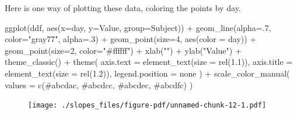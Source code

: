 \documentclass[
  letterpaper,
  DIV=11,
  numbers=noendperiod]{scrreprt}
\newenvironment{Shaded}{\begin{snugshade}}{\end{snugshade}}
\newcommand{\AttributeTok}[1]{\textcolor[rgb]{0.40,0.45,0.13}{#1}}
\newcommand{\DecValTok}[1]{\textcolor[rgb]{0.68,0.00,0.00}{#1}}
\newcommand{\FloatTok}[1]{\textcolor[rgb]{0.68,0.00,0.00}{#1}}
\newcommand{\FunctionTok}[1]{\textcolor[rgb]{0.28,0.35,0.67}{#1}}
\newcommand{\NormalTok}[1]{\textcolor[rgb]{0.00,0.23,0.31}{#1}}
\newcommand{\SpecialCharTok}[1]{\textcolor[rgb]{0.37,0.37,0.37}{#1}}
\newcommand{\StringTok}[1]{\textcolor[rgb]{0.13,0.47,0.30}{#1}}
\begin{document}
Here is one way of plotting these data, coloring the points by day.

\begin{Shaded}
\begin{Highlighting}[]
\FunctionTok{ggplot}\NormalTok{(ddf, }\FunctionTok{aes}\NormalTok{(}\AttributeTok{x=}\NormalTok{day, }\AttributeTok{y=}\NormalTok{Value, }\AttributeTok{group=}\NormalTok{Subject)) }\SpecialCharTok{+}
  \FunctionTok{geom\_line}\NormalTok{(}\AttributeTok{alpha=}\NormalTok{.}\DecValTok{7}\NormalTok{, }\AttributeTok{color=}\StringTok{"gray77"}\NormalTok{, }\AttributeTok{alpha=}\NormalTok{.}\DecValTok{3}\NormalTok{) }\SpecialCharTok{+}
  \FunctionTok{geom\_point}\NormalTok{(}\AttributeTok{size=}\DecValTok{4}\NormalTok{, }\FunctionTok{aes}\NormalTok{(}\AttributeTok{color =}\NormalTok{ day)) }\SpecialCharTok{+}
  \FunctionTok{geom\_point}\NormalTok{(}\AttributeTok{size=}\DecValTok{2}\NormalTok{, }\AttributeTok{color=}\StringTok{"\#ffffff"}\NormalTok{) }\SpecialCharTok{+}
  \FunctionTok{xlab}\NormalTok{(}\StringTok{""}\NormalTok{) }\SpecialCharTok{+}
  \FunctionTok{ylab}\NormalTok{(}\StringTok{"Value"}\NormalTok{) }\SpecialCharTok{+}
  \FunctionTok{theme\_classic}\NormalTok{() }\SpecialCharTok{+}
  \FunctionTok{theme}\NormalTok{(}
    \AttributeTok{axis.text =} \FunctionTok{element\_text}\NormalTok{(}\AttributeTok{size =} \FunctionTok{rel}\NormalTok{(}\FloatTok{1.1}\NormalTok{)),}
    \AttributeTok{axis.title =} \FunctionTok{element\_text}\NormalTok{(}\AttributeTok{size =} \FunctionTok{rel}\NormalTok{(}\FloatTok{1.2}\NormalTok{)),}
    \AttributeTok{legend.position =} \StringTok{\textquotesingle{}none\textquotesingle{}}
\NormalTok{  ) }\SpecialCharTok{+}
  \FunctionTok{scale\_color\_manual}\NormalTok{(}
    \AttributeTok{values =}  \FunctionTok{c}\NormalTok{(}\StringTok{\textquotesingle{}\#abcdac\textquotesingle{}}\NormalTok{, }\StringTok{\textquotesingle{}\#abcdcc\textquotesingle{}}\NormalTok{, }\StringTok{\textquotesingle{}\#abcdec\textquotesingle{}}\NormalTok{, }\StringTok{\textquotesingle{}\#abcdfc\textquotesingle{}}\NormalTok{)}
\NormalTok{    )}
\end{Highlighting}
\end{Shaded}

\begin{figure}[H]

{\centering \texttt{[image: ./slopes\_files/figure-pdf/unnamed-chunk-12-1.pdf]}

}

\end{figure}
\end{document}
